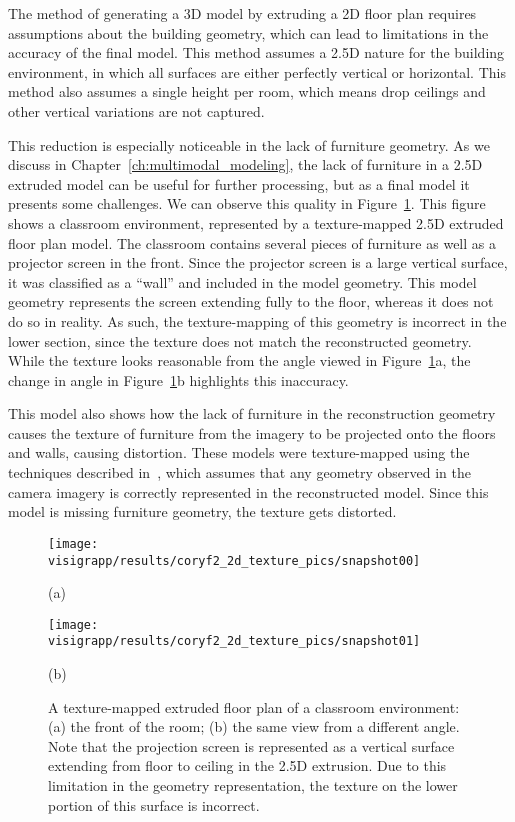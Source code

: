 \documentclass[12pt,onecolumn,oneside]{book}
\begin{document}
The method of generating a 3D model by extruding a 2D floor plan requires assumptions about the building geometry, which can lead to limitations in the accuracy of the final model.  This method assumes a 2.5D nature for the building environment, in which all surfaces are either perfectly vertical or horizontal.  This method also assumes a single height per room, which means drop ceilings and other vertical variations are not captured.

This reduction is especially noticeable in the lack of furniture geometry.  As we discuss in Chapter~\ref{ch:multimodal_modeling}, the lack of furniture in a 2.5D extruded model can be useful for further processing, but as a final model it presents some challenges.  We can observe this quality in Figure~\ref{fig:cory299_texture}.  This figure shows a classroom environment, represented by a texture-mapped 2.5D extruded floor plan model.  The classroom contains several pieces of furniture as well as a projector screen in the front.  Since the projector screen is a large vertical surface, it was classified as a ``wall'' and included in the model geometry.  This model geometry represents the screen extending fully to the floor, whereas it does not do so in reality.  As such, the texture-mapping of this geometry is incorrect in the lower section, since the texture does not match the reconstructed geometry.  While the texture looks reasonable from the angle viewed in Figure~\ref{fig:cory299_texture}a, the change in angle in Figure~\ref{fig:cory299_texture}b highlights this inaccuracy.  

This model also shows how the lack of furniture in the reconstruction geometry causes the texture of furniture from the imagery to be projected onto the floors and walls, causing distortion.  These models were texture-mapped using the techniques described in~\cite{Cheng14}, which assumes that any geometry observed in the camera imagery is correctly represented in the reconstructed model.  Since this model is missing furniture geometry, the texture gets distorted. 

\begin{figure}[H]
   \centering
   \begin{minipage}[b]{0.49\linewidth}
   \texttt{[image: visigrapp/results/coryf2\_2d\_texture\_pics/snapshot00]}
   \centerline{(a)}
   \end{minipage}
   \hfill
   \begin{minipage}[b]{0.49\linewidth}
   \texttt{[image: visigrapp/results/coryf2\_2d\_texture\_pics/snapshot01]}
   \centerline{(b)}
   \end{minipage}

   \caption[Limitations of 2.5D models.]{A texture-mapped extruded floor plan of a classroom environment: (a) the front of the room; (b) the same view from a different angle.  Note that the projection screen is represented as a vertical surface extending from floor to ceiling in the 2.5D extrusion.  Due to this limitation in the geometry representation, the texture on the lower portion of this surface is incorrect.
   \protect
   \label{fig:cory299_texture}}
\end{figure}
\end{document}
